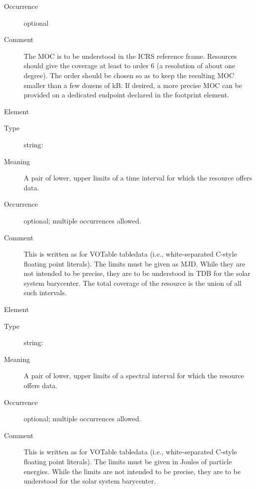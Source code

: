 \documentclass[11pt,a4paper]{ivoa}
\begin{document}
\begin{generated}
\begin{bigdescription}
\begin{description}
\item[Occurrence] optional
\item[Comment] 
                  The MOC is to be understood in the ICRS reference frame.
                  Resources should give the coverage at least to order 6
                  (a resolution of about one degree).  The order should be
                  chosen so as to keep the resulting MOC smaller than a few
                  dozens of kB.  If desired, a more precise MOC can be provided
                  on a dedicated endpoint declared in the footprint element.
               

\end{description}
\item[Element \xmlel{temporal}]
\begin{description}
\item[Type] string: 
\item[Meaning] 
                  A pair of lower, upper limits of a time interval 
                  for which the resource offers data.
               
\item[Occurrence] optional; multiple occurrences allowed.
\item[Comment] 
                  This is written as for VOTable tabledata (i.e., 
                  white-separated C-style floating point literals).
                  The limits must be given as MJD.  While they
                  are not intended to be precise, they are to be understood
                  in TDB for the solar system barycenter.  The total coverage
                  of the resource is the union of all such intervals.
               

\end{description}
\item[Element \xmlel{spectral}]
\begin{description}
\item[Type] string: 
\item[Meaning] 
                  A pair of lower, upper limits of a spectral interval 
                  for which the resource offers data.
               
\item[Occurrence] optional; multiple occurrences allowed.
\item[Comment] 
                  This is written as for VOTable tabledata (i.e., 
                  white-separated C-style floating point literals).
                  The limits must be given in Joules of particle
                  energies.  While the limits are not intended 
                  to be precise, they are to be understood for the
                  solar system barycenter.
               

\end{description}
\end{bigdescription}
\end{generated}
\end{document}
